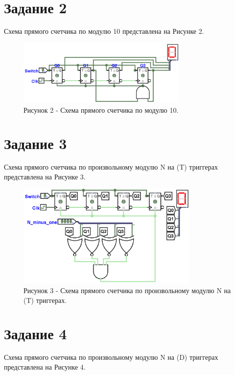 \documentclass[oneside,a4paper,14pt]{extarticle}
\begin{document}
\newpage

\section*{Задание 2}
\noindent Схема прямого счетчика по модулю 10 представлена на Рисунке 2.\\

\begin{figure}[h!]
	\centering
	\includegraphics[width=0.75\textwidth]{pics/2.png}
	\caption*{Рисунок 2 - Схема прямого счетчика по модулю 10.}
\end{figure}
\newpage

\section*{Задание 3}
\noindent Схема прямого счетчика по произвольному модулю N на (T) триггерах представлена на Рисунке 3.\\

\begin{figure}[h!]
	\centering
	\includegraphics[width=0.8\textwidth]{pics/3.png}
	\caption*{Рисунок 3 - Схема прямого счетчика по произвольному модулю N на (T) триггерах.}
\end{figure}
\newpage

\section*{Задание 4}

\noindent Схема прямого счетчика по произвольному модулю N на (D) триггерах представлена на Рисунке 4.\\
\end{document}
